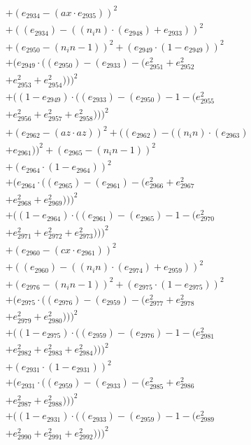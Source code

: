 \documentclass[10pt, a4paper]{article}
\begin{document}
\begin{small}
\begin{align*}
& + (e_{2934} - (ax  \cdot  e_{2935}))^{2} \\
& + ((e_{2934}) - ((n_in)  \cdot  (e_{2948}) + e_{2933}))^{2} \\
& + (e_{2950} - (n_in - 1))^{2} + (e_{2949}  \cdot  (1 - e_{2949}))^{2} \\
& + (e_{2949}  \cdot  ((e_{2950}) - (e_{2933}) - (e_{2951}^{2} + e_{2952}^{2} \\
& + e_{2953}^{2} + e_{2954}^{2})))^{2} \\
& + ((1 - e_{2949})  \cdot  ((e_{2933}) - (e_{2950}) - 1 - (e_{2955}^{2} \\
& + e_{2956}^{2} + e_{2957}^{2} + e_{2958}^{2})))^{2} \\
& + (e_{2962} - (az  \cdot  az))^{2} + ((e_{2962}) - ((n_in)  \cdot  (e_{2963}) \\
& + e_{2961}))^{2} + (e_{2965} - (n_in - 1))^{2} \\
& + (e_{2964}  \cdot  (1 - e_{2964}))^{2} \\
& + (e_{2964}  \cdot  ((e_{2965}) - (e_{2961}) - (e_{2966}^{2} + e_{2967}^{2} \\
& + e_{2968}^{2} + e_{2969}^{2})))^{2} \\
& + ((1 - e_{2964})  \cdot  ((e_{2961}) - (e_{2965}) - 1 - (e_{2970}^{2} \\
& + e_{2971}^{2} + e_{2972}^{2} + e_{2973}^{2})))^{2} \\
& + (e_{2960} - (cx  \cdot  e_{2961}))^{2} \\
& + ((e_{2960}) - ((n_in)  \cdot  (e_{2974}) + e_{2959}))^{2} \\
& + (e_{2976} - (n_in - 1))^{2} + (e_{2975}  \cdot  (1 - e_{2975}))^{2} \\
& + (e_{2975}  \cdot  ((e_{2976}) - (e_{2959}) - (e_{2977}^{2} + e_{2978}^{2} \\
& + e_{2979}^{2} + e_{2980}^{2})))^{2} \\
& + ((1 - e_{2975})  \cdot  ((e_{2959}) - (e_{2976}) - 1 - (e_{2981}^{2} \\
& + e_{2982}^{2} + e_{2983}^{2} + e_{2984}^{2})))^{2} \\
& + (e_{2931}  \cdot  (1 - e_{2931}))^{2} \\
& + (e_{2931}  \cdot  ((e_{2959}) - (e_{2933}) - (e_{2985}^{2} + e_{2986}^{2} \\
& + e_{2987}^{2} + e_{2988}^{2})))^{2} \\
& + ((1 - e_{2931})  \cdot  ((e_{2933}) - (e_{2959}) - 1 - (e_{2989}^{2} \\
& + e_{2990}^{2} + e_{2991}^{2} + e_{2992}^{2})))^{2} \\

\end{align*}
\end{small}
\end{document}
